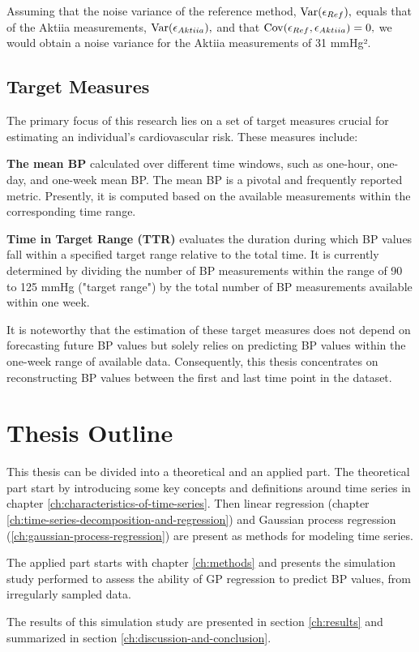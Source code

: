 Assuming that the noise variance of the reference method, $\operatorname{Var}(\epsilon_{Ref}),$
equals that of the Aktiia measurements, $\operatorname{Var}(\epsilon_{Aktiia}),$ and that
$\operatorname{Cov}(\epsilon_{Ref}, \epsilon_{Aktiia})=0,$ we would obtain a noise variance for the Aktiia
measurements of 31 mmHg².

\subsection{Target Measures}\label{subsec:target-measures}

The primary focus of this research lies on a set of target measures crucial for
estimating an individual's cardiovascular risk. These measures include:

\textbf{The mean BP} calculated over different time windows, such as one-hour,
one-day, and one-week mean BP. The mean BP is a pivotal and frequently reported
metric. Presently, it is computed based on the available measurements within the
corresponding time range.

\textbf{Time in Target Range (TTR)} evaluates the duration during which BP values
fall within a specified target range relative to the total time. It is currently
determined by dividing the number of BP measurements within the range of 90 to
125 mmHg ("target range") by the total number of BP measurements available
within one week.

It is noteworthy that the estimation of these target measures does not depend on
forecasting future BP values but solely relies on predicting BP values within the
one-week range of available data. Consequently, this thesis concentrates on
reconstructing BP values between the first and last time point in the dataset.

\section{Thesis Outline}

This thesis can be divided into a theoretical and an applied part.
The theoretical part start by introducing some key concepts and definitions around
time series in chapter \ref{ch:characteristics-of-time-series}.
Then linear regression (chapter \ref{ch:time-series-decomposition-and-regression})
and Gaussian process regression (\ref{ch:gaussian-process-regression})
are present as methods for modeling time series.

The applied part starts with chapter \ref{ch:methods} and presents
the simulation study performed to assess the ability of GP regression
to predict BP values, from irregularly sampled data.

The results of this simulation study are presented in section \ref{ch:results}
and summarized in section \ref{ch:discussion-and-conclusion}.
